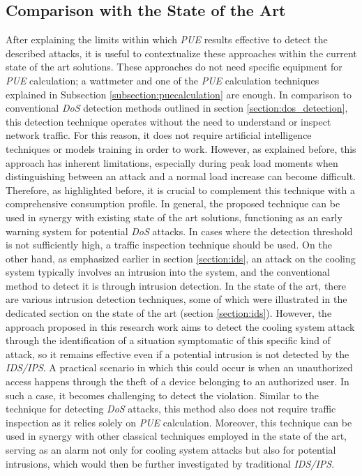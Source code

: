 \subsection{Comparison with the State of the Art}
After explaining the limits within which \emph{PUE} results effective to detect the described attacks, it is useful to contextualize these approaches within the current state of the art solutions. These approaches do not need specific equipment for \emph{PUE} calculation; a wattmeter and one of the \emph{PUE} calculation techniques explained in Subsection \ref{subsection:puecalculation} are enough. In comparison to conventional \emph{DoS} detection methods outlined in section \ref{section:dos_detection}, this detection technique operates without the need to understand or inspect network traffic. For this reason, it does not require artificial intelligence techniques or models training in order to work. However, as explained before, this approach has inherent limitations, especially during peak load moments when distinguishing between an attack and a normal load increase can become difficult. Therefore, as highlighted before, it is crucial to complement this technique with a comprehensive consumption profile. In general, the proposed technique can be used in synergy with existing state of the art solutions, functioning as an early warning system for potential \emph{DoS} attacks. In cases where the detection threshold is not sufficiently high, a traffic inspection technique should be used. 
On the other hand, as emphasized earlier in section \ref{section:ids}, an attack on the cooling system typically involves an intrusion into the system, and the conventional method to detect it is through intrusion detection. In the state of the art, there are various intrusion detection techniques, some of which were illustrated in the dedicated section on the state of the art (section \ref{section:ids}). However, the approach proposed in this research work aims to detect the cooling system attack through the identification of a situation symptomatic of this specific kind of attack, so it remains effective even if a potential intrusion is not detected by the \emph{IDS/IPS}.
A practical scenario in which this could occur is when an unauthorized access happens through the theft of a device belonging to an authorized user. In such a case, it becomes challenging to detect the violation. Similar to the technique for detecting \emph{DoS} attacks, this method also does not require traffic inspection as it relies solely on \emph{PUE} calculation. Moreover, this technique can be used in synergy with other classical techniques employed in the state of the art, serving as an alarm not only for cooling system attacks but also for potential intrusions, which would then be further investigated by traditional \emph{IDS/IPS}.
